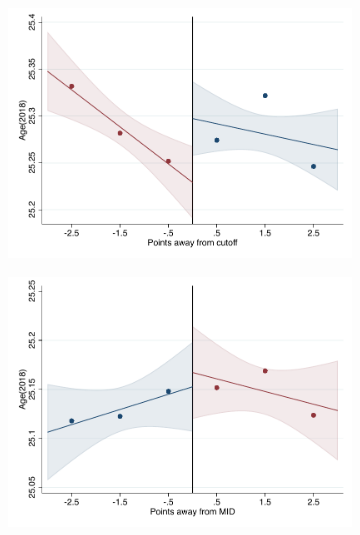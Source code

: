 \documentclass[oneside,11pt]{article}
\begin{document}
\begin{figure}[H]

    \caption{RD plots for balance variables across those assigned to IPN high-school, and those who are not\label{fig:Balance_rd_plot_IPN_1}}
    \begin{center}
    
    \begin{subfigure}{0.475\textwidth}
        \centering
        \includegraphics[width=\textwidth]{04_Figures/rd_plot_tau_age2018_IPN3.pdf}
    \end{subfigure}
    \begin{subfigure}{0.475\textwidth}
        \centering
        \includegraphics[width=\textwidth]{04_Figures/rd_plot_mid_age2018_IPN3.pdf}
    \end{subfigure}


\end{center}
\end{figure}
\end{document}
